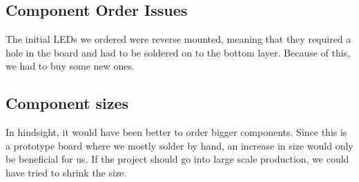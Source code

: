 \subsection{Component Order Issues}
The initial LEDs we ordered were reverse mounted, meaning that they required a hole in the board and had to be soldered on to the bottom layer. Because of this, we had to buy some new ones.
\newline
\newline

\subsection{Component sizes}
In hindsight, it would have been better to order bigger components. Since this is a prototype board where we mostly solder by hand, an increase in size would only be beneficial for us. If the project should go into large scale production, we could have tried to shrink the size.


